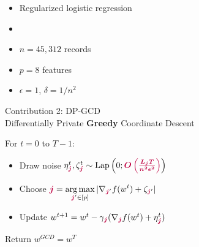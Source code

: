\documentclass[17pt,aspectratio=169]{beamer}
\begin{document}
\begin{frame}
\begin{minipage}{0.5\linewidth}
  \end{minipage}%
  \begin{minipage}{0.5\linewidth}
    \small
    \begin{itemize}
    \item Regularized logistic regression
    \item {}
    \item $n=45,312$ records
    \item $p=8$ features
    \item $\epsilon=1$, $\delta=1/n^2$
    \end{itemize}
  \end{minipage}

\end{frame}

\begin{frame}{Contribution 2: DP-GCD \\[-0.5em]
    \normalsize Differentially Private {\bfseries{Greedy}} Coordinate Descent}

  \small

  For $t = 0$ to $T-1$:
  \vspace{0.5em}
  \begin{itemize}
    \setlength\itemsep{0.5em}
  \item Draw noise $\eta_{\boldsymbol{\textcolor{purple}{j}}}^t, \zeta_{\boldsymbol{\textcolor{purple}{j}}}^t \sim \operatorname{Lap}\left(0; \boldsymbol{\textcolor{purple}{O\left(\frac{L_{\boldsymbol{\textcolor{purple}{j}}} T}{n^2 \epsilon^2}\right)}}\right)$
  \item Choose $\displaystyle {\boldsymbol{\textcolor{purple}{j}}} = \operatorname*{\arg\max}_{{\boldsymbol{\textcolor{purple}{j}}}' \in [p]} |  \nabla_{{\boldsymbol{\textcolor{purple}{j}}}'} f(w^t) + \zeta_{{\boldsymbol{\textcolor{purple}{j}}}'} |$

    \vspace{-0.5em}

  \item Update $w^{t+1} = w^t - \gamma_{\boldsymbol{\textcolor{purple}{j}}} ( \nabla_{\boldsymbol{\textcolor{purple}{j}}} f( w^t ) + \eta_{\boldsymbol{\textcolor{purple}{j}}}^t )$
  \end{itemize}

  \vspace{0.5em}

  Return $w^{GCD} = w^T$


\end{frame}
\end{document}
